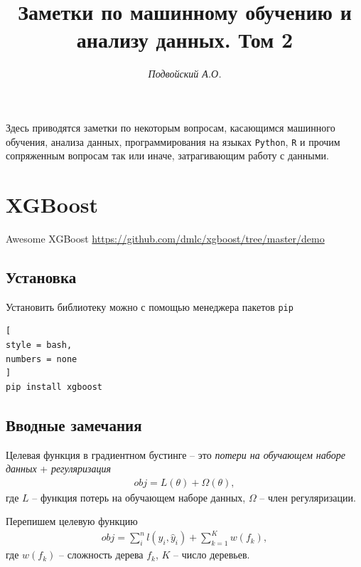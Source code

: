 \documentclass[%
	11pt,
	a4paper,
	utf8,
		]{article}
\begin{document}
\title{Заметки по машинному обучению и анализу данных. Том 2}

\author{\itshape Подвойский А.О.}

\date{}
\maketitle

\thispagestyle{fancy}

Здесь приводятся заметки по некоторым вопросам, касающимся машинного обучения, анализа данных, программирования на языках \texttt{Python}, \texttt{R} и прочим сопряженным вопросам так или иначе, затрагивающим работу с данными.



\tableofcontents

\section{XGBoost}

Awesome XGBoost \url{https://github.com/dmlc/xgboost/tree/master/demo}

\subsection{Установка}

Установить библиотеку можно с помощью менеджера пакетов \verb|pip|
\begin{lstlisting}[
style = bash,
numbers = none	
]
pip install xgboost
\end{lstlisting}

\subsection{Вводные замечания}

Целевая функция в градиентном бустинге -- это \emph{потери на обучающем наборе данных} + \emph{регуляризация}
\begin{align*}
	obj  = L(\theta) + \Omega (\theta),
\end{align*}
где $ L $ -- функция потерь на обучающем наборе данных, $ \Omega $ -- член регуляризации.

Перепишем целевую функцию
\begin{align*}
	obj = \sum_i^n l(y_i, \hat{y}_i) +\sum_{k=1}^K w(f_k),
\end{align*}
где $ w(f_k) $ -- сложность дерева $ f_k $, $ K $ -- число деревьев.
\end{document}
